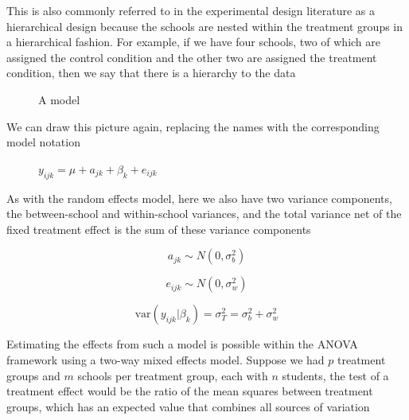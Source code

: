 This is also commonly referred to in the experimental design literature as a hierarchical design because the schools are nested within the treatment groups in a hierarchical fashion. For example, if we have four schools, two of which are assigned the control condition and the other two are assigned the treatment condition, then we say that there is a hierarchy to the data

\begin{figure}
  \centering
  \caption{A model}
\end{figure}

We can draw this picture again, replacing the names with the corresponding model notation

\begin{figure}
  \centering
   \caption{$y_{ijk} = \mu + a_{jk} + \beta_k + e_{ijk}$}
\end{figure}


As with the random effects model, here we also have two variance components, the between-school and within-school variances, and the total variance net of the fixed treatment effect is the sum of these variance components

\[
a_{jk} \sim N\left(0,\sigma_b^2\right)
\]

\[
e_{ijk} \sim N\left(0,\sigma_w^2\right)
\]

\[
\mbox{var}\left(y_{ijk}|\beta_k\right) = \sigma_T^2  = \sigma_b^2 +\sigma_w^2
\]

Estimating the effects from such a model is possible within the ANOVA framework using a two-way mixed effects model. Suppose we had $p$ treatment groups and $m$ schools per treatment group, each with $n$ students, the test of a treatment effect would be the ratio of the mean squares between treatment groups, which has an expected value that combines all sources of variation

